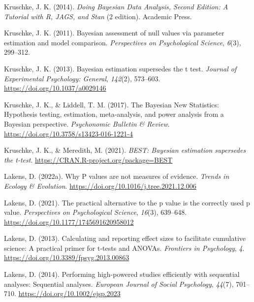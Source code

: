 \documentclass[
  oneside]{krantz}
\newlength{\cslhangindent}
\newlength{\cslentryspacingunit} %
\newenvironment{CSLReferences}[2] %
 {%
  \setlength{\parindent}{0pt}
  \ifodd #1
  \let\oldpar\par
  \def\par{\hangindent=\cslhangindent\oldpar}
  \fi
  \setlength{\parskip}{#2\cslentryspacingunit}
 }%
 {}
\begin{document}
\begin{CSLReferences}{1}{0}
\leavevmode{}%
Kruschke, J. K. (2014). \emph{Doing {Bayesian Data Analysis}, {Second
Edition}: {A Tutorial} with {R}, {JAGS}, and {Stan}} (2 edition).
{Academic Press}.

\leavevmode{}%
Kruschke, J. K. (2011). Bayesian assessment of null values via parameter
estimation and model comparison. \emph{Perspectives on Psychological
Science}, \emph{6}(3), 299--312.

\leavevmode{}%
Kruschke, J. K. (2013). Bayesian estimation supersedes the t test.
\emph{Journal of Experimental Psychology: General}, \emph{142}(2),
573--603. \url{https://doi.org/10.1037/a0029146}

\leavevmode{}%
Kruschke, J. K., \& Liddell, T. M. (2017). The {Bayesian New
Statistics}: {Hypothesis} testing, estimation, meta-analysis, and power
analysis from a {Bayesian} perspective. \emph{Psychonomic Bulletin \&
Review}. \url{https://doi.org/10.3758/s13423-016-1221-4}

\leavevmode{}%
Kruschke, J. K., \& Meredith, M. (2021). \emph{BEST: Bayesian estimation
supersedes the t-test}. \url{https://CRAN.R-project.org/package=BEST}

\leavevmode{}%
Lakens, D. (2022a). Why {P} values are not measures of evidence.
\emph{Trends in Ecology \& Evolution}.
\url{https://doi.org/10.1016/j.tree.2021.12.006}

\leavevmode{}%
Lakens, D. (2021). The practical alternative to the p value is the
correctly used p value. \emph{Perspectives on Psychological Science},
\emph{16}(3), 639--648. \url{https://doi.org/10.1177/1745691620958012}

\leavevmode{}%
Lakens, D. (2013). Calculating and reporting effect sizes to facilitate
cumulative science: A practical primer for t-tests and {ANOVAs}.
\emph{Frontiers in Psychology}, \emph{4}.
\url{https://doi.org/10.3389/fpsyg.2013.00863}

\leavevmode{}%
Lakens, D. (2014). Performing high-powered studies efficiently with
sequential analyses: {Sequential} analyses. \emph{European Journal of
Social Psychology}, \emph{44}(7), 701--710.
\url{https://doi.org/10.1002/ejsp.2023}


\end{CSLReferences}
\end{document}
